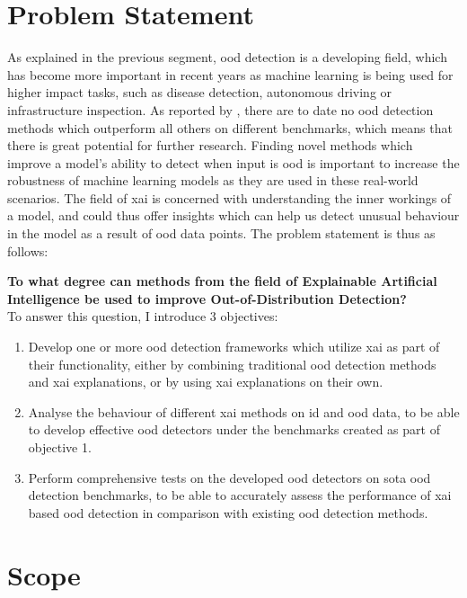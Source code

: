 \documentclass[UKenglish]{uiomasterthesis} %
\theoremstyle{definition}
\begin{document}
\section{Problem Statement} \label{section:problemstatement}

As explained in the previous segment, \ac{ood} detection is a developing field, which has become more important in recent years as machine learning is being used for higher impact tasks, such as disease detection, autonomous driving or infrastructure inspection. As reported by \cite{openood15}, there are to date no \ac{ood} detection methods which outperform all others on different benchmarks, which means that there is great potential for further research. Finding novel methods which improve a model's ability to detect when input is \ac{ood} is important to increase the robustness of machine learning models as they are used in these real-world scenarios. The field of \ac{xai} is concerned with understanding the inner workings of a model, and could thus offer insights which can help us detect unusual behaviour in the model as a result of \ac{ood} data points. The problem statement is thus as follows:

\textbf{To what degree can methods from the field of Explainable Artificial Intelligence be used to improve Out-of-Distribution Detection?}
\\

To answer this question, I introduce 3 objectives:

\begin{enumerate}
    \item Develop one or more \ac{ood} detection frameworks which utilize \ac{xai} as part of their functionality, either by combining traditional \ac{ood} detection methods and \ac{xai} explanations, or by using \ac{xai} explanations on their own.
    \item Analyse the behaviour of different \ac{xai} methods on \ac{id} and \ac{ood} data, to be able to develop effective \ac{ood} detectors under the benchmarks created as part of objective 1.
    \item Perform comprehensive tests on the developed \ac{ood} detectors on \ac{sota} \ac{ood} detection benchmarks, to be able to accurately assess the performance of \ac{xai} based \ac{ood} detection in comparison with existing \ac{ood} detection methods.
\end{enumerate}

\section{Scope} \label{section:scope}
\end{document}
